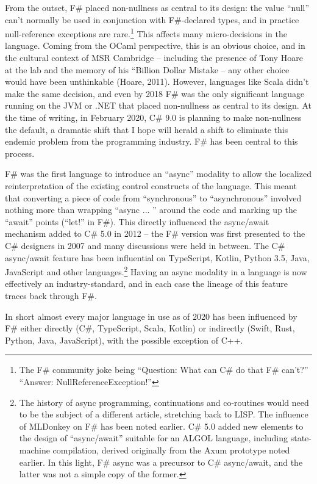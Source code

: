 \documentclass[acmsmall]{acmart}\settopmatter{}
\begin{document}
From the outset, F\# placed non-nullness as central to its design: the value “null” can’t normally be used in conjunction
with F\#-declared types, and in practice null-reference exceptions are rare.\footnote{The F\# community joke being “Question: What can C\# do that F\# can’t?” “Answer: NullReferenceException!”}   This affects many micro-decisions in the
language. Coming from the OCaml perspective, this is an obvious choice, and in the cultural context of MSR
Cambridge – including the presence of Tony Hoare at the lab and the memory of his “Billion Dollar Mistake – any
other choice would have been unthinkable (Hoare, 2011).  However, languages like Scala didn’t make the same
decision, and even by 2018 F\# was the only significant language running on the JVM or .NET that placed non-nullness
as central to its design. At the time of writing, in February 2020, C\# 9.0 is planning to make non-nullness the
default, a dramatic shift that I hope will herald a shift to eliminate this endemic problem from the programming industry. F\# has been central to this process.

F\# was the first language to introduce an “async” modality to allow the localized reinterpretation of the existing
control constructs of the language. This meant that converting a piece of code from “synchronous” to
“asynchronous” involved nothing more than wrapping “async { ... }” around the code and marking up
the “await” points (“let!” in F\#).   This directly influenced the async/await mechanism added to C\# 5.0 in 2012 – the
F\# version was first presented to the C\# designers in 2007 and many discussions were held in
between.  The C\# async/await feature has been influential on TypeScript, Kotlin, Python 3.5, Java, JavaScript and other
languages.\footnote{The history of async programming, continuations and co-routines would need to be the subject
of a different article, stretching back to LISP. The influence of MLDonkey
on F\# has been noted earlier. C\# 5.0 added new elements to the design
of “async/await” suitable for an ALGOL language, including state-machine compilation,
derived originally from the Axum prototype noted earlier.  In this light, F\# async was a
precursor to C\# async/await, and the latter was not a simple copy of the former.}
Having an async modality in a language is now effectively an industry-standard, and in each case the lineage of this feature traces back through F\#.

In short almost every major language in use as of 2020 has been influenced by F\# either directly (C\#, TypeScript, Scala, Kotlin) or
indirectly (Swift, Rust, Python, Java, JavaScript), with the possible exception of C++.
\end{document}
